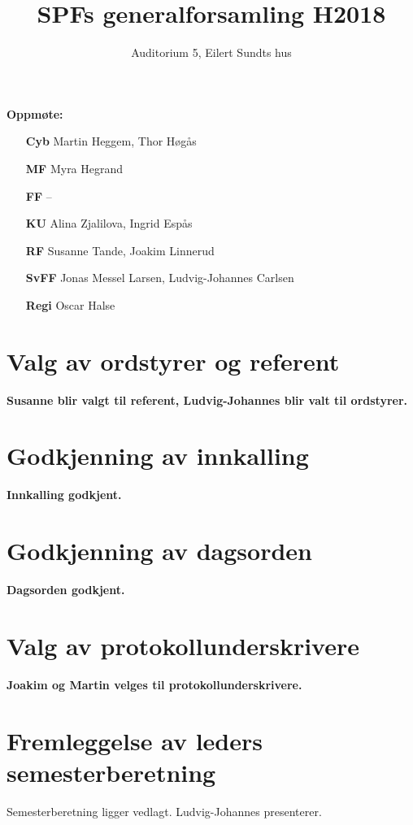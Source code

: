 \documentclass[a4paper,norsk]{article}
\title{SPFs generalforsamling H2018}
\author{Auditorium 5, Eilert Sundts hus}
\begin{document}
\maketitle
\textbf{Oppmøte:}
	\begin{itemize}
		\item[\textbf{Cyb}] Martin Heggem, Thor Høgås
		\item[\textbf{MF}] Myra Hegrand
		\item[\textbf{FF}] --
		\item[\textbf{KU}] Alina Zjalilova, Ingrid Espås
		\item[\textbf{RF}] Susanne Tande, Joakim Linnerud
		\item[\textbf{SvFF}] Jonas Messel Larsen, Ludvig-Johannes Carlsen
		\item[\textbf{Regi}] Oscar Halse
	\end{itemize}
\tableofcontents

\section{Valg av ordstyrer og referent}
\textbf{Susanne blir valgt til referent, Ludvig-Johannes blir valt til ordstyrer.}

\section{Godkjenning av innkalling}
\textbf{Innkalling godkjent.}

\section{Godkjenning av dagsorden}
\textbf{Dagsorden godkjent.}

\section{Valg av protokollunderskrivere}
\textbf{Joakim og Martin velges til protokollunderskrivere.}

\section{Fremleggelse av leders semesterberetning}
Semesterberetning ligger vedlagt. Ludvig-Johannes presenterer.
\end{document}
